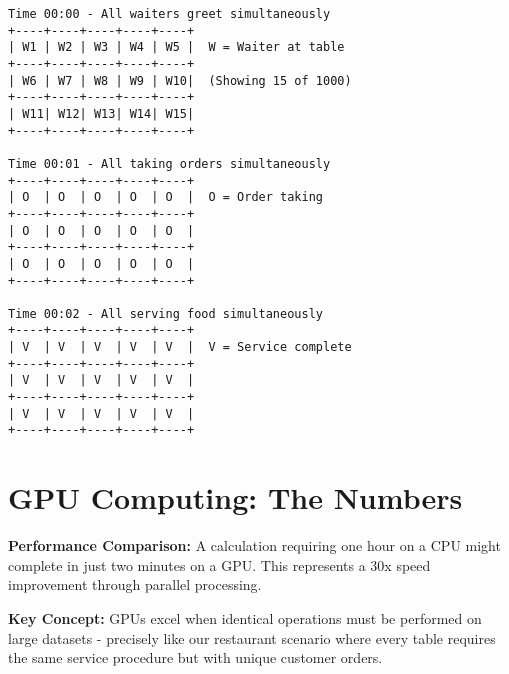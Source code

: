 \documentclass[11pt, a4paper]{article}
\begin{document}
\begin{verbatim}
Time 00:00 - All waiters greet simultaneously
+----+----+----+----+----+
| W1 | W2 | W3 | W4 | W5 |  W = Waiter at table
+----+----+----+----+----+
| W6 | W7 | W8 | W9 | W10|  (Showing 15 of 1000)
+----+----+----+----+----+
| W11| W12| W13| W14| W15|
+----+----+----+----+----+

Time 00:01 - All taking orders simultaneously
+----+----+----+----+----+
| O  | O  | O  | O  | O  |  O = Order taking
+----+----+----+----+----+
| O  | O  | O  | O  | O  |
+----+----+----+----+----+
| O  | O  | O  | O  | O  |
+----+----+----+----+----+

Time 00:02 - All serving food simultaneously
+----+----+----+----+----+
| V  | V  | V  | V  | V  |  V = Service complete
+----+----+----+----+----+
| V  | V  | V  | V  | V  |
+----+----+----+----+----+
| V  | V  | V  | V  | V  |
+----+----+----+----+----+
\end{verbatim}

\section*{GPU Computing: The Numbers}

\textbf{Performance Comparison:} A calculation requiring one hour on a CPU
might complete in just two minutes on a GPU. This represents a 30x speed
improvement through parallel processing.

\textbf{Key Concept:} GPUs excel when identical operations must be performed on
large datasets - precisely like our restaurant scenario where every table
requires the same service procedure but with unique customer orders.
\end{document}

